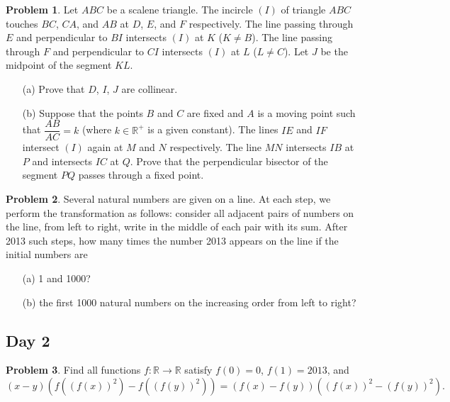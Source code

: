\documentclass[11pt]{article}
\theoremstyle{definition}
\newtheorem{exercise}{Problem}
\newcommand{\boom}{\vspace{0.25cm}}
\begin{document}
        \boom
    
        \begin{exercise}
            Let \(ABC\) be a scalene triangle. The incircle \((I)\) of triangle \(ABC\) touches \(BC\), \(CA\), and \(AB\) at \(D\), \(E\), and \(F\) respectively. The line passing through \(E\) and perpendicular to \(BI\) intersects \((I)\) at \(K\) (\(K \neq B\)). The line passing through \(F\) and perpendicular to \(CI\) intersects \((I)\) at \(L\) (\(L \neq C\)). Let \(J\) be the midpoint of the segment \(KL\).
            \begin{enumerate}
                \item[(a)] Prove that \(D\), \(I\), \(J\) are collinear.
                \item[(b)] Suppose that the points \(B\) and \(C\) are fixed and \(A\) is a moving point such that \(\dfrac{AB}{AC} = k\) (where \(k \in \mathbb{R}^+\) is a given constant). The lines \(IE\) and \(IF\) intersect \((I)\) again at \(M\) and \(N\) respectively. The line \(MN\) intersects \(IB\) at \(P\) and intersects \(IC\) at \(Q\). Prove that the perpendicular bisector of the segment \(PQ\) passes through a fixed point.
            \end{enumerate}
        \end{exercise}
    
        \boom
    
        \begin{exercise}
            Several natural numbers are given on a line. At each step, we perform the transformation as follows: consider all adjacent pairs of numbers on the line, from left to right, write in the middle of each pair with its sum. After 2013 such steps, how many times the number 2013 appears on the line if the initial numbers are
            \begin{enumerate}
                \item[(a)] 1 and 1000?
                \item[(b)] the first 1000 natural numbers on the increasing order from left to right?
            \end{enumerate}
        \end{exercise}

    \newpage
    
    \subsection*{Day 2}

        \begin{exercise}
            Find all functions \(f: \mathbb{R} \to \mathbb{R}\) satisfy \(f(0) = 0\), \(f(1) = 2013\), and
            \[(x - y)\left(f\left(\left(f(x)\right)^2\right) - f\left(\left(f(y)\right)^2\right)\right) = \left(f(x) - f(y)\right)\left(\left(f(x)\right)^2 - \left(f(y)\right)^2\right).\]
        \end{exercise}
    
\end{document}
